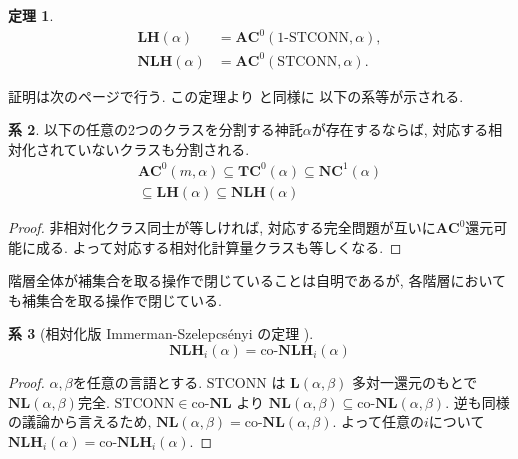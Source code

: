 \documentclass[10pt,a4paper,twocolumn]{jarticle}
\theoremstyle{definition}
\newtheorem{theorem}{定理}%
\newtheorem{corollary}[theorem]{系}
\theoremstyle{remark}
\newcommand{\classfont}{\mathbf}
\newcommand{\co}{\text{co-}}
\newcommand{\AC}{\classfont{AC}}
\newcommand{\TC}{\classfont{TC}}
\newcommand{\NC}{\classfont{NC}}
\renewcommand{\L}{\classfont{L}}
\newcommand{\NL}{\classfont{NL}}
\newcommand{\LH}{\classfont{LH}}
\newcommand{\NLH}{\classfont{NLH}}
\newcommand{\probfont}{\text}
\newcommand{\oneSTCONN}{\probfont{1-STCONN}}
\newcommand{\STCONN}{\probfont{STCONN}}
\begin{document}
\begin{theorem}
 \label{theorem:main1}
 \begin{align*}
 \LH(\alpha) &= \AC^0(\oneSTCONN, \alpha),
  \\
 \NLH(\alpha) &= \AC^0(\STCONN, \alpha).
 \end{align*}  
\end{theorem}


証明は次のページで行う.
この定理より \cite{aehlig2007relativizing} と同様に
以下の系等が示される.

\begin{corollary}
\label{corollary:start}
以下の任意の2つのクラスを分割する神託$\alpha$が存在するならば,
対応する相対化されていないクラスも分割される.
\begin{gather*}
 \AC^0(m, \alpha) 
  \subseteq \TC^0(\alpha)
  \subseteq \NC^1(\alpha)
 \\
  \subseteq \LH(\alpha)
  \subseteq \NLH(\alpha)
\end{gather*}
\end{corollary}

\begin{proof}
 非相対化クラス同士が等しければ, 
 対応する完全問題が互いに$\AC^0$還元可能に成る.
 よって対応する相対化計算量クラスも等しくなる.
\end{proof}


階層全体が補集合を取る操作で閉じていることは自明であるが,
各階層においても補集合を取る操作で閉じている.
\begin{corollary}
[相対化版 Immerman-Szelepcs{\'e}nyi の定理
{\cite{immerman1988nondeterministic}\cite{szelepcsenyi1988method}}]
\begin{equation*}
 \NLH_i(\alpha) = \co\NLH_i(\alpha) 
\end{equation*}
\end{corollary}

\begin{proof}
 $\alpha, \beta$を任意の言語とする.
 $\STCONN$ は $\L(\alpha, \beta)$ 多対一還元のもとで $\NL(\alpha, \beta)$完全.
 $\STCONN \in \co\NL$ より $\NL(\alpha, \beta) \subseteq \co\NL(\alpha, \beta)$.
 逆も同様の議論から言えるため, $\NL(\alpha, \beta) = \co\NL(\alpha, \beta)$.
 よって任意の$i$について $\NLH_i(\alpha) = \co\NLH_i(\alpha)$.
\end{proof}
\end{document}
